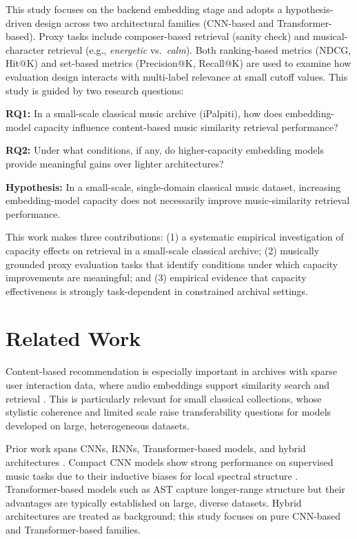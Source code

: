 \documentclass{article}
\begin{document}
This study focuses on the backend embedding stage and adopts a hypothesis-driven design across two architectural families (CNN-based and Transformer-based). Proxy tasks include composer-based retrieval (sanity check) and musical-character retrieval (e.g., \emph{energetic} vs.\ \emph{calm}). Both ranking-based metrics (NDCG, Hit@K) and set-based metrics (Precision@K, Recall@K) are used to examine how evaluation design interacts with multi-label relevance at small cutoff values. This study is guided by two research questions:

\smallskip
\noindent\textbf{RQ1:} In a small-scale classical music archive (iPalpiti), how does embedding-model capacity influence content-based music similarity retrieval performance?

\noindent\textbf{RQ2:} Under what conditions, if any, do higher-capacity embedding models provide meaningful gains over lighter architectures?

\noindent\textbf{Hypothesis:} In a small-scale, single-domain classical music dataset, increasing embedding-model capacity does not necessarily improve music-similarity retrieval performance.

\smallskip
This work makes three contributions: (1) a systematic empirical investigation of capacity effects on retrieval in a small-scale classical archive; (2) musically grounded proxy evaluation tasks that identify conditions under which capacity improvements are meaningful; and (3) empirical evidence that capacity effectiveness is strongly task-dependent in constrained archival settings.

\section{Related Work}\label{sec:related-work}

Content-based recommendation is especially important in archives with sparse user interaction data, where audio embeddings support similarity search and retrieval \cite{tamm2024}. This is particularly relevant for small classical collections, whose stylistic coherence and limited scale raise transferability questions for models developed on large, heterogeneous datasets.

Prior work spans CNNs, RNNs, Transformer-based models, and hybrid architectures \cite{zaman2023}. Compact CNN models show strong performance on supervised music tasks due to their inductive biases for local spectral structure \cite{kong2020panns, jiang2024}. Transformer-based models such as AST capture longer-range structure \cite{gong2021ast} but their advantages are typically established on large, diverse datasets. Hybrid architectures \cite{lin2024, pourmoazemi2024} are treated as background; this study focuses on pure CNN-based and Transformer-based families.
\end{document}
